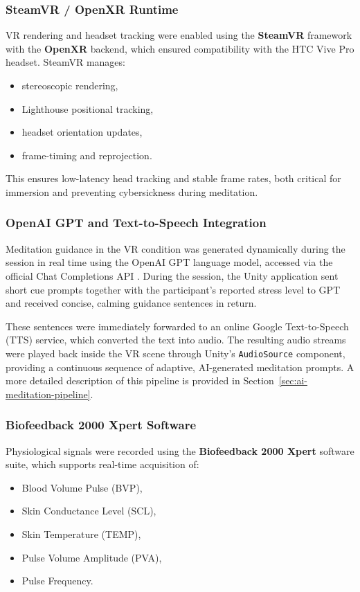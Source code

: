 \subsubsection{SteamVR / OpenXR Runtime}

VR rendering and headset tracking were enabled using the \textbf{SteamVR} framework with the \textbf{OpenXR} backend, which ensured compatibility with the HTC Vive Pro headset. SteamVR manages:
\begin{itemize}
    \item stereoscopic rendering,
    \item Lighthouse positional tracking,
    \item headset orientation updates,
    \item frame-timing and reprojection.
\end{itemize}

This ensures low-latency head tracking and stable frame rates, both critical for immersion and preventing cybersickness during meditation.

\subsubsection{OpenAI GPT and Text-to-Speech Integration}

Meditation guidance in the VR condition was generated dynamically during the session in real time using the OpenAI
GPT language model, accessed via the official Chat Completions API
\cite{openai_gpt}. During the session, the Unity application sent short cue prompts
together with the participant's reported stress level to GPT and received concise, calming guidance
sentences in return.

These sentences were immediately forwarded to an online Google Text-to-Speech (TTS)
service, which converted the text into audio. The resulting audio streams were
played back inside the VR scene through Unity's \texttt{AudioSource} component,
providing a continuous sequence of adaptive, AI-generated meditation prompts. A
more detailed description of this pipeline is provided in
Section~\ref{sec:ai-meditation-pipeline}.


\subsubsection{Biofeedback 2000 Xpert Software}

Physiological signals were recorded using the \textbf{Biofeedback 2000 Xpert} software suite, which supports real-time acquisition of:
\begin{itemize}
    \item Blood Volume Pulse (BVP),
    \item Skin Conductance Level (SCL),
    \item Skin Temperature (TEMP),
    \item Pulse Volume Amplitude (PVA),
    \item Pulse Frequency.
\end{itemize}

